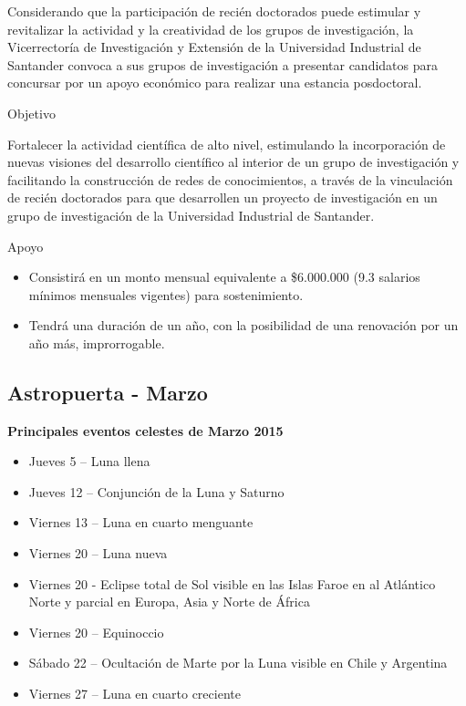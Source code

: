 \documentclass{book}
\begin{document}
Considerando que la participación de recién doctorados puede estimular y revitalizar la
actividad y la creatividad de los grupos de investigación, la Vicerrectoría de Investigación y
Extensión de la Universidad Industrial de Santander convoca a sus grupos de investigación
a presentar candidatos para concursar por un apoyo económico para realizar una estancia
posdoctoral.
\begin{description}
\item[Objetivo]
\end{description}
Fortalecer la actividad científica de alto nivel, estimulando la incorporación de nuevas visiones
del desarrollo científico al interior de un grupo de investigación y facilitando la construcción
de redes de conocimientos, a través de la vinculación de recién doctorados para
que desarrollen un proyecto de investigación en un grupo de investigación de la Universidad
Industrial de Santander.
\begin{description}
\item[Apoyo]
\end{description}
\begin{itemize}
\item Consistirá en un monto mensual equivalente a \$6.000.000 (9.3 salarios mínimos mensuales
vigentes) para sostenimiento.
\item Tendrá una duración de un año, con la posibilidad de una renovación por un año más,
improrrogable.
\end{itemize}


\subsection{Astropuerta - Marzo}

\textbf{Principales eventos celestes de Marzo 2015}
\begin{itemize}

\item    Jueves 5 – Luna llena
\item    Jueves 12 – Conjunción de la Luna y Saturno
\item    Viernes 13 – Luna en cuarto menguante
\item    Viernes 20 – Luna nueva
\item    Viernes 20 - Eclipse total de Sol visible en las Islas Faroe en al Atlántico Norte y parcial en Europa, Asia y Norte de África
\item    Viernes 20 – Equinoccio
\item    Sábado 22 – Ocultación de Marte por la Luna visible en Chile y Argentina
\item    Viernes 27 – Luna en cuarto creciente
\end{itemize}
\end{document}
